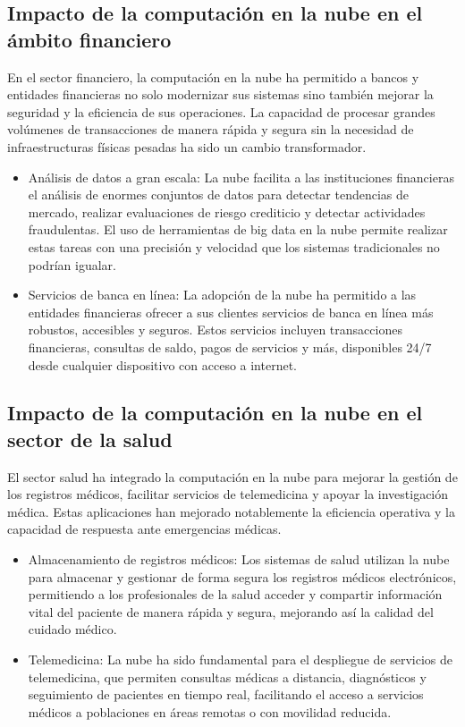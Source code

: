 {        \subsection[Impacto en el {\'a}mbito financiero]{Impacto de la computaci{\'o}n en la nube en el {\'a}mbito financiero}
            En el sector financiero, la computaci{\'o}n en la nube ha permitido a bancos y entidades financieras no solo modernizar sus sistemas sino tambi{\'e}n mejorar la seguridad y la eficiencia de sus operaciones. La capacidad de procesar grandes vol{\'u}menes de transacciones de manera r{\'a}pida y segura sin la necesidad de infraestructuras f{\'i}sicas pesadas ha sido un cambio transformador.

            \begin{itemize}
                \item An{\'a}lisis de datos a gran escala: La nube facilita a las instituciones financieras el an{\'a}lisis de enormes conjuntos de datos para detectar tendencias de mercado, realizar evaluaciones de riesgo crediticio y detectar actividades fraudulentas. El uso de herramientas de big data en la nube permite realizar estas tareas con una precisi{\'o}n y velocidad que los sistemas tradicionales no podr{\'i}an igualar.
                \item Servicios de banca en l{\'i}nea: La adopci{\'o}n de la nube ha permitido a las entidades financieras ofrecer a sus clientes servicios de banca en l{\'i}nea m{\'a}s robustos, accesibles y seguros. Estos servicios incluyen transacciones financieras, consultas de saldo, pagos de servicios y m{\'a}s, disponibles 24/7 desde cualquier dispositivo con acceso a internet.
            \end{itemize}
        \subsection[Impacto en el sector de la salud]{Impacto de la computaci{\'o}n en la nube en el sector de la salud}
            El sector salud ha integrado la computaci{\'o}n en la nube para mejorar la gesti{\'o}n de los registros m{\'e}dicos, facilitar servicios de telemedicina y apoyar la investigaci{\'o}n m{\'e}dica. Estas aplicaciones han mejorado notablemente la eficiencia operativa y la capacidad de respuesta ante emergencias m{\'e}dicas.

            \begin{itemize}
                \item Almacenamiento de registros m{\'e}dicos: Los sistemas de salud utilizan la nube para almacenar y gestionar de forma segura los registros m{\'e}dicos electr{\'o}nicos, permitiendo a los profesionales de la salud acceder y compartir informaci{\'o}n vital del paciente de manera r{\'a}pida y segura, mejorando as{\'i} la calidad del cuidado m{\'e}dico.
                \item Telemedicina: La nube ha sido fundamental para el despliegue de servicios de telemedicina, que permiten consultas m{\'e}dicas a distancia, diagn{\'o}sticos y seguimiento de pacientes en tiempo real, facilitando el acceso a servicios m{\'e}dicos a poblaciones en {\'a}reas remotas o con movilidad reducida.
            \end{itemize}
}
